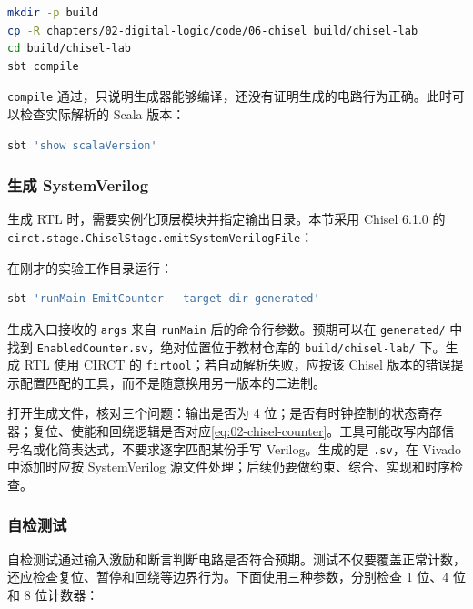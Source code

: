 \begin{lstlisting}[language=bash,numbers=none]
mkdir -p build
cp -R chapters/02-digital-logic/code/06-chisel build/chisel-lab
cd build/chisel-lab
sbt compile
\end{lstlisting}

\texttt{compile} 通过，只说明生成器能够编译，还没有证明生成的电路行为正确。此时可以检查实际解析的 Scala 版本：

\begin{lstlisting}[language=bash,numbers=none]
sbt 'show scalaVersion'
\end{lstlisting}

\subsubsection*{生成 SystemVerilog}

生成 RTL 时，需要实例化顶层模块并指定输出目录。本节采用 Chisel 6.1.0 的 \texttt{circt.stage.ChiselStage.emitSystemVerilogFile}\citep{c02-chisel-stage}：


在刚才的实验工作目录运行：

\begin{lstlisting}[language=bash,numbers=none]
sbt 'runMain EmitCounter --target-dir generated'
\end{lstlisting}

生成入口接收的 \texttt{args} 来自 \texttt{runMain} 后的命令行参数。预期可以在 \texttt{generated/} 中找到 \texttt{EnabledCounter.sv}，绝对位置位于教材仓库的 \texttt{build/chisel-lab/} 下。生成 RTL 使用 CIRCT 的 \texttt{firtool}；若自动解析失败，应按该 Chisel 版本的错误提示配置匹配的工具，而不是随意换用另一版本的二进制。

打开生成文件，核对三个问题：输出是否为 4 位；是否有时钟控制的状态寄存器；复位、使能和回绕逻辑是否对应\cref{eq:02-chisel-counter}。工具可能改写内部信号名或化简表达式，不要求逐字匹配某份手写 Verilog。生成的是 \texttt{.sv}，在 Vivado 中添加时应按 SystemVerilog 源文件处理；后续仍要做约束、综合、实现和时序检查。

\subsubsection*{自检测试}

自检测试通过输入激励和断言判断电路是否符合预期。测试不仅要覆盖正常计数，还应检查复位、暂停和回绕等边界行为。下面使用三种参数，分别检查 1 位、4 位和 8 位计数器：

